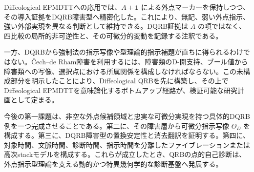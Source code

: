 \documentclass[a4paper,11pt]{ltjsarticle}
\theoremstyle{definition}
\theoremstyle{plain}
\newcommand{\Unit}{\mathbf 1}
\begin{document}
Diffeological EPMDTTへの応用では、$A+\Unit$ による外点マーカーを保持しつつ、その導入証拠をDQRB障害型へ精密化した。これにより、無記、弱い外点指示、強い外部実現を異なる判断として維持できる。DQRB証拠は $A$ の項ではなく、四比較の局所的非可逆性と、その可微分的変動を記録する注釈である。

一方、DQRBから強制法の指示写像や型理論的指示補題が直ちに得られるわけではない。\v{C}ech--de Rham障害を利用するには、障害類のD-開支持、ブール値から障害類への写像、選択点における所属関係を構成しなければならない。この未構成部分を明示したことにより、Diffeological QRBを先に構築し、その上でDiffeological EPMDTTを意味論化するボトムアップ経路が、検証可能な研究計画として定まる。

今後の第一課題は、非空な外点候補領域と忠実な可微分実現を持つ具体的DQRB例を一つ完成させることである。第二に、その障害層から可微分指示写像 $\Theta_D$ を構成する。第三に、DQRB障害型の置換安定性と消去翻訳を証明する。第四に、対象時間、文脈時間、診断時間、指示時間を分離したファイブレーションまたは高次stackモデルを構成する。これらが成立したとき、QRBの点的自己診断は、外点指示型理論を支える動的かつ特異幾何学的な診断基盤へ発展する。



\end{document}
